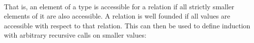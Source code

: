 \begin{code}[hide]
\AgdaSpace{}%
\AgdaSpace{}%
\AgdaSpace{}%
\AgdaSpace{}%
\AgdaSpace{}%
\AgdaSpace{}%
\AgdaSpace{}%
\AgdaSpace{}%
\AgdaSymbol{(}\AgdaSpace{}%
\AgdaSpace{}%
\AgdaSpace{}%
\AgdaSymbol{))}\<%
\\
%
\>[2]\AgdaSpace{}%
\AgdaSpace{}%
\AgdaSpace{}%
\AgdaSymbol{(}\AgdaSpace{}%
\AgdaSymbol{)}\AgdaSpace{}%
\AgdaSymbol{=}\AgdaSpace{}%
\<%
\\
%
\\[\AgdaEmptyExtraSkip]%
\>[0]\AgdaSpace{}%
\AgdaSpace{}%
\AgdaSymbol{\{}\AgdaOperator{\AgdaBound{\AgdaUnderscore{}<\AgdaUnderscore{}}}\AgdaSpace{}%
\AgdaSymbol{:}\AgdaSpace{}%
\AgdaSpace{}%
\AgdaSpace{}%
\AgdaSymbol{\}}\AgdaSpace{}%
\AgdaSymbol{(}\AgdaSpace{}%
\AgdaSymbol{:}\AgdaSpace{}%
\AgdaSpace{}%
\AgdaOperator{\AgdaBound{\AgdaUnderscore{}<\AgdaUnderscore{}}}\AgdaSymbol{)}\AgdaSpace{}%
\AgdaSpace{}%
\<%
\\
%
\\[\AgdaEmptyExtraSkip]%
\>[0][@{}l@{\AgdaIndent{0}}]%
\>[2]\AgdaSpace{}%
\AgdaSymbol{:}\AgdaSpace{}%
\AgdaSpace{}%
\AgdaSymbol{(}\AgdaSpace{}%
\AgdaOperator{\AgdaBound{\AgdaUnderscore{}<\AgdaUnderscore{}}}\AgdaSpace{}%
\AgdaSymbol{\{}\AgdaSpace{}%
\AgdaSymbol{=}\AgdaSpace{}%
\AgdaSymbol{\})}\<%
\\
%
\>[2]\AgdaSpace{}%
\AgdaSpace{}%
\AgdaSpace{}%
\AgdaSpace{}%
\AgdaSymbol{=}\AgdaSpace{}%
\AgdaSpace{}%
\AgdaSpace{}%
\AgdaSpace{}%
\AgdaSpace{}%
\AgdaSymbol{(}\AgdaSpace{}%
\AgdaSymbol{)}\<%
\end{code}


That is, an element of a type is accessible for a relation if all strictly
smaller elements of it are also accessible. A relation is well founded
if all values are accessible with respect to that relation.
This can then be used to define induction with arbitrary recursive
calls on smaller values:

